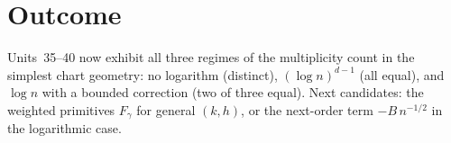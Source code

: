 \documentclass[11pt]{article}
\begin{document}
\section{Outcome}
Units~35--40 now exhibit all three regimes of the multiplicity count in the simplest chart geometry:
no logarithm (distinct), $(\log n)^{d-1}$ (all equal), and $\log n$ with a bounded correction (two of
three equal). Next candidates: the weighted primitives $F_\gamma$ for general $(k,h)$, or the
next-order term $-B\,n^{-1/2}$ in the logarithmic case.
\end{document}
